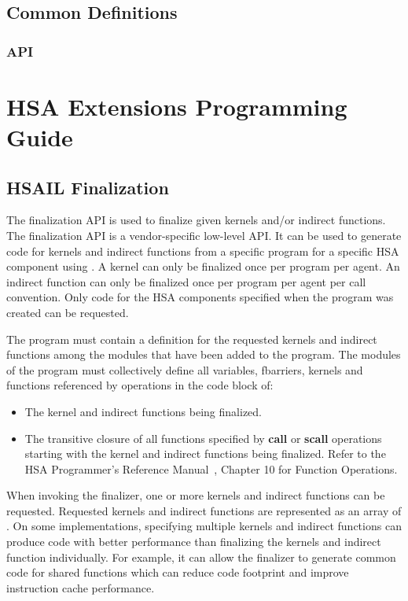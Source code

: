 \documentclass[final,oneside]{book}
\newcommand{\reffun}[1]{\textbf{#1}}
\newcommand{\refhsl}[1]{\reffun{#1}}
\begin{document}


\section{Common Definitions}\label{sec:other}
\subsection{API}

%


\chapter{HSA Extensions Programming Guide}

\section{HSAIL Finalization}\label{sec:finalizer}

The finalization API is used to finalize given kernels and/or indirect
functions.  The finalization API is a vendor-specific low-level API. It can be
used to generate code for kernels and indirect functions from a specific program
for a specific HSA component using . A kernel can only
be finalized once per program per agent. An indirect function can only be
finalized once per program per agent per call convention. Only code for the HSA
components specified when the program was created can be requested.

The program must contain a definition for the requested kernels and indirect
functions among the modules that have been added to the program. The modules
of the program must collectively define all variables, fbarriers, kernels and
functions referenced by operations in the code block of:
\begin{itemize}
\item{The kernel and indirect functions being finalized.}
\item{The transitive closure of all functions specified by \refhsl{call} or
    \refhsl{scall} operations starting with the kernel and indirect functions
    being finalized.  Refer to the HSA Programmer's Reference Manual~\cite{prm},
    Chapter 10 for Function Operations.}
\end{itemize}

When invoking the finalizer, one or more kernels and indirect functions can be
requested. Requested kernels and indirect functions are represented as an array
of . On some implementations, specifying
multiple kernels and indirect functions can produce code with better performance
than finalizing the kernels and indirect function individually. For example, it
can allow the finalizer to generate common code for shared functions which can
reduce code footprint and improve instruction cache performance.
\end{document}
